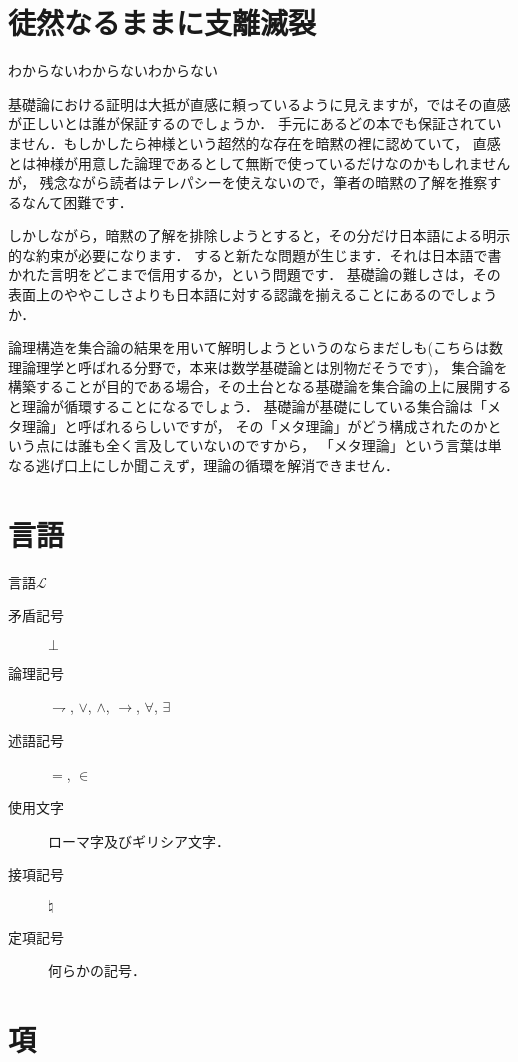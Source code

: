 \documentclass[a4j,10.5pt,oneside,openany]{jsbook}
\begin{document}

\section{徒然なるままに支離滅裂}
わからないわからないわからない

基礎論における証明は大抵が直感に頼っているように見えますが，ではその直感が正しいとは誰が保証するのでしょうか．
手元にあるどの本でも保証されていません．もしかしたら神様という超然的な存在を暗黙の裡に認めていて，
直感とは神様が用意した論理であるとして無断で使っているだけなのかもしれませんが，
残念ながら読者はテレパシーを使えないので，筆者の暗黙の了解を推察するなんて困難です．

しかしながら，暗黙の了解を排除しようとすると，その分だけ日本語による明示的な約束が必要になります．
すると新たな問題が生じます．それは日本語で書かれた言明をどこまで信用するか，という問題です．
基礎論の難しさは，その表面上のややこしさよりも日本語に対する認識を揃えることにあるのでしょうか．

論理構造を集合論の結果を用いて解明しようというのならまだしも(こちらは数理論理学と呼ばれる分野で，本来は数学基礎論とは別物だそうです)，
集合論を構築することが目的である場合，その土台となる基礎論を集合論の上に展開すると理論が循環することになるでしょう．
基礎論が基礎にしている集合論は「メタ理論」と呼ばれるらしいですが，
その「メタ理論」がどう構成されたのかという点には誰も全く言及していないのですから，
「メタ理論」という言葉は単なる逃げ口上にしか聞こえず，理論の循環を解消できません．

\section{言語}
	言語$\mathcal{L}$
	\begin{description}
		\item[矛盾記号] $\bot$
		\item[論理記号]  $\rightharpoondown$, $\vee$, $\wedge$, $\rightarrow$,
			$\forall$, $\exists$
		\item[述語記号] $=$, $\in$
		\item[使用文字] ローマ字及びギリシア文字．
		\item[接項記号] $\natural$
		\item[定項記号] 何らかの記号．
	\end{description}

\section{項}
	
\end{document}
